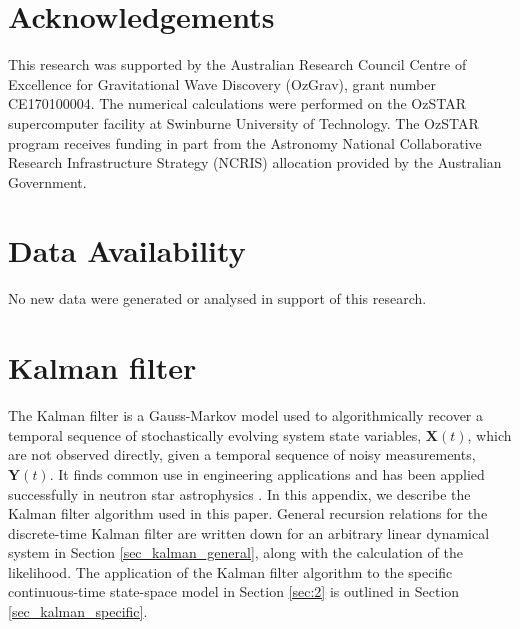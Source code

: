 \documentclass[fleqn,usenatbib,useAMS]{mnras}
\begin{document}
\section*{Acknowledgements}
This research was supported by the Australian Research Council Centre of Excellence for Gravitational Wave Discovery (OzGrav), grant number CE170100004. The numerical calculations were performed on the OzSTAR supercomputer facility at Swinburne University of Technology. The OzSTAR program receives funding in part from the Astronomy National Collaborative Research Infrastructure Strategy (NCRIS) allocation provided by the Australian Government.


\section*{Data Availability}
No new data were generated or analysed in support of this research.






\appendix
\newpage
\newpage
\clearpage


\section{Kalman filter} \label{sec:kalman}
The Kalman filter \citep{Kalman1} is a Gauss-Markov model used to algorithmically recover a temporal sequence of stochastically evolving  system state variables, $\boldsymbol{X}(t)$, which are not observed directly, given a temporal sequence of noisy measurements, $\boldsymbol{Y}(t)$. It finds common use in engineering applications and has been applied successfully in neutron star astrophysics \citep[e.g.][]{Myers2021MNRAS.502.3113M,Meyers2021,Melatos2023}. In this appendix, we describe the Kalman filter algorithm used in this paper. General recursion relations for the discrete-time Kalman filter are written down for an arbitrary linear dynamical system in Section \ref{sec_kalman_general}, along with the calculation of the likelihood. The application of the Kalman filter algorithm to the specific continuous-time state-space model in Section \ref{sec:2} is outlined in Section \ref{sec_kalman_specific}.

%
\end{document}
